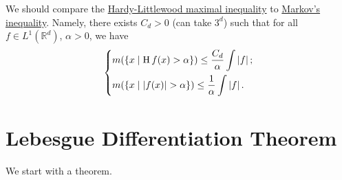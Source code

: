 We should compare the \hyperref[thm:HL-maximal-inequality]{Hardy-Littlewood maximal inequality} to \hyperref[lma:Markov-inequality]{Markov's inequality}. Namely, there exists \(C_{d} >0\) (can take \(3^d\)) such that for all \(f\in L^1(\mathbb{R} ^d)\), \(\alpha > 0\), we have
\[
	\begin{dcases}
		m(\left\{x\mid \operatorname{H}f(x) > \alpha\right\})                \leq \frac{C_{d} }{\alpha }\int \left\vert f \right\vert; \\
		m(\left\{x\mid \left\vert f(x) \right\vert > \alpha \right\})  \leq \frac{1}{\alpha }\int \left\vert f \right\vert.
	\end{dcases}
\]

\section{Lebesgue Differentiation Theorem}
We start with a theorem.

